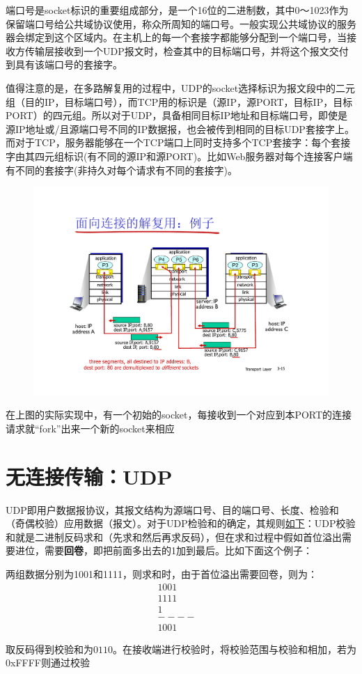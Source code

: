 \documentclass[]{report}
\begin{document}
		端口号是socket标识的重要组成部分，是一个16位的二进制数，其中0～1023作为保留端口号给公共域协议使用，称众所周知的端口号。一般实现公共域协议的服务器会绑定到这个区域内。在主机上的每一个套接字都能够分配到一个端口号，当接收方传输层接收到一个UDP报文时，检查其中的目标端口号，并将这个报文交付到具有该端口号的套接字。\par
		值得注意的是，在多路解复用的过程中，UDP的socket选择标识为报文段中的二元组（目的IP，目标端口号），而TCP用的标识是（源IP，源PORT，目标IP，目标PORT）的四元组。所以对于UDP，具备相同目标IP地址和目标端口号，即使是源IP地址或/且源端口号不同的IP数据报，也会被传到相同的目标UDP套接字上。而对于TCP，服务器能够在一个TCP端口上同时支持多个TCP套接字：每个套接字由其四元组标识(有不同的源IP和源PORT)。比如Web服务器对每个连接客户端有不同的套接字(非持久对每个请求有不同的套接字)。
		\begin{figure}[h!]
			\centering
			\begin{minipage}{40em}
				\centering
				\includegraphics[scale = 0.4]{images/TCP_Socket_Ports.pdf}
			\end{minipage}
		\end{figure}
		在上图的实际实现中，有一个初始的socket，每接收到一个对应到本PORT的连接请求就“fork”出来一个新的socket来相应
	\section{无连接传输：UDP}
		UDP即用户数据报协议，其报文结构为源端口号、目的端口号、长度、检验和（奇偶校验）应用数据（报文）。对于UDP检验和的确定，其规则\href{https://www.zhihu.com/question/66620337}{如下}：UDP校验和就是二进制反码求和（先求和然后再求反码），但在求和过程中假如首位溢出需要进位，需要\textbf{回卷}，即把前面多出去的1加到最后。比如下面这个例子：\par
		两组数据分别为1001和1111，则求和时，由于首位溢出需要回卷，则为：
		\[\begin{aligned}
			1001&\\
			1111&\\
			1&\\
			----&\\
			1001&
		\end{aligned}\]\par
		取反码得到校验和为$0110$。在接收端进行校验时，将校验范围与校验和相加，若为0xFFFF则通过校验
\end{document}

